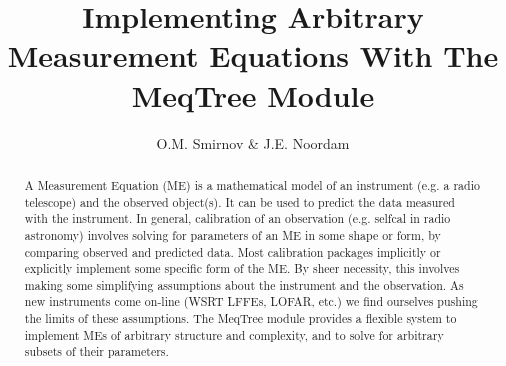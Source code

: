 \documentclass[11pt,twoside]{article}  %
\begin{document}



\title{Implementing Arbitrary Measurement Equations With The MeqTree Module}

\author{O.M. Smirnov \& J.E. Noordam}




%
%


\begin{abstract}           

A Measurement Equation (ME) is a mathematical model of an instrument (e.g. a
radio telescope) and the observed object(s). It can be used to predict  the data
measured with the instrument. In general, calibration of an observation (e.g.
selfcal in radio astronomy) involves solving for parameters of an ME in some
shape or form, by comparing observed and predicted data. Most calibration
packages implicitly or explicitly implement some specific form of the ME. By
sheer necessity, this involves making some simplifying assumptions about the
instrument and the observation. As new instruments come on-line (WSRT LFFEs,
LOFAR, etc.) we find ourselves pushing the limits of these assumptions. The
MeqTree module provides a flexible system to implement MEs of arbitrary
structure and complexity, and to solve for arbitrary subsets of their
parameters. 

\end{abstract}
\end{document}
